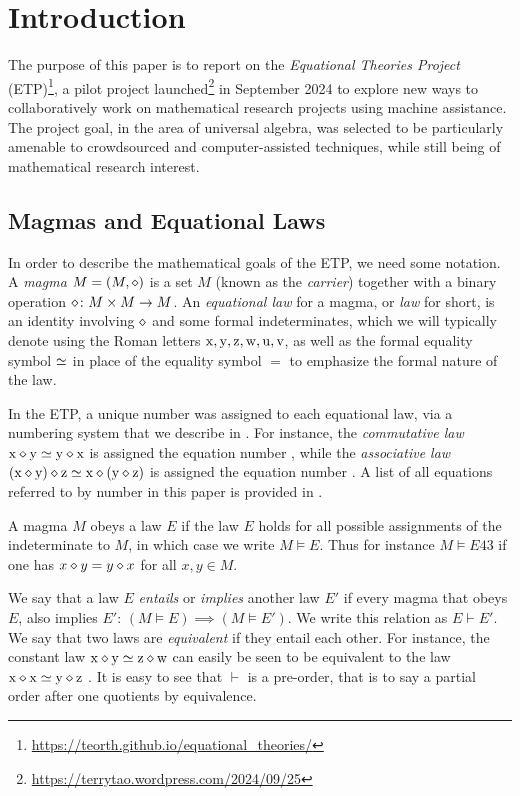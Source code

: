 \section{Introduction}

The purpose of this paper is to report on the \emph{Equational Theories Project} (ETP)\footnote{\url{https://teorth.github.io/equational_theories/}}, a pilot project launched\footnote{\url{https://terrytao.wordpress.com/2024/09/25}} in September 2024 to explore new ways to collaboratively work on mathematical research projects using machine assistance. The project goal, in the area of universal algebra, was selected to be particularly amenable to crowdsourced and computer-assisted techniques, while still being of mathematical research interest. 

\subsection{Magmas and Equational Laws}

In order to describe the mathematical goals of the ETP, we need some notation. A \emph{magma} $M = (M,\diamond)$ is a set $M$ (known as the \emph{carrier}) together with a binary operation $\diamond \colon M \times M \to M$. An \emph{equational law} for a magma, or \emph{law} for short, is an identity involving $\diamond$ and some formal indeterminates, which we will typically denote using the Roman letters $\mathrm{x},\mathrm{y},\mathrm{z},\mathrm{w},\mathrm{u},\mathrm{v}$, as well as the formal equality symbol $\simeq$ in place of the equality symbol $=$ to emphasize the formal nature of the law.

In the ETP, a unique number was assigned to each equational law, via a numbering system that we describe in .  For instance, the \emph{commutative law} $\mathrm{x} \diamond \mathrm{y} \simeq \mathrm{y} \diamond \mathrm{x}$ is assigned the equation number , while the \emph{associative law} $(\mathrm{x} \diamond \mathrm{y}) \diamond \mathrm{z} \simeq \mathrm{x} \diamond (\mathrm{y} \diamond \mathrm{z})$ is assigned the equation number .  A list of all equations referred to by number in this paper is provided in .

A magma $M$ obeys a law $E$ if the law $E$ holds for all possible assignments of the indeterminate to $M$, in which case we write $M \models E$. Thus for instance $M \models E43$ if one has $x \diamond y = y \diamond x$ for all $x,y \in M$.

We say that a law $E$ \emph{entails} or \emph{implies} another law $E'$ if every magma that obeys $E$, also implies $E'$: $(M \models E) \implies (M \models E')$.  We write this relation as $E \vdash E'$. We say that two laws are \emph{equivalent} if they entail each other. For instance, the constant law $\mathrm{x} \diamond \mathrm{y} \simeq \mathrm{z} \diamond \mathrm{w}$  can easily be seen to be equivalent to the law $\mathrm{x} \diamond \mathrm{x} \simeq \mathrm{y} \diamond \mathrm{z}$ .  It is easy to see that $\vdash$ is a pre-order, that is to say a partial order after one quotients by equivalence.

